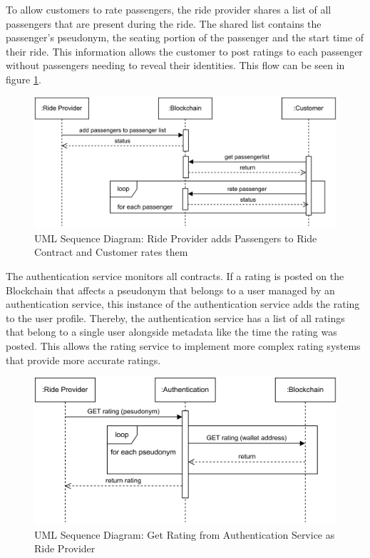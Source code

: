 To allow customers to rate passengers, the ride provider shares a list of all passengers that are present during the ride. The shared list contains the passenger's pseudonym, the seating portion of the passenger and the start time of their ride. This information allows the customer to post ratings to each passenger without passengers needing to reveal their identities. This flow can be seen in figure \ref{fig:addPassenger}.

\begin{figure}[h]
    \centering
    \includegraphics[width=\linewidth]{data/8.svg}
    \caption{UML Sequence Diagram: Ride Provider adds Passengers to Ride Contract and Customer rates them}
    \label{fig:addPassenger}
\end{figure}


The authentication service monitors all contracts. If a rating is posted on the Blockchain that affects a pseudonym that belongs to a user managed by an authentication service, this instance of the authentication service adds the rating to the user profile. Thereby, the authentication service has a list of all ratings that belong to a single user alongside metadata like the time the rating was posted. This allows the rating service to implement more complex rating systems that provide more accurate ratings.


\begin{figure}[h]
    \centering
    \includegraphics[width=\linewidth]{data/7.svg}
    \caption{UML Sequence Diagram: Get Rating from Authentication Service as Ride Provider}
    \label{fig:ratingRP}
\end{figure}

